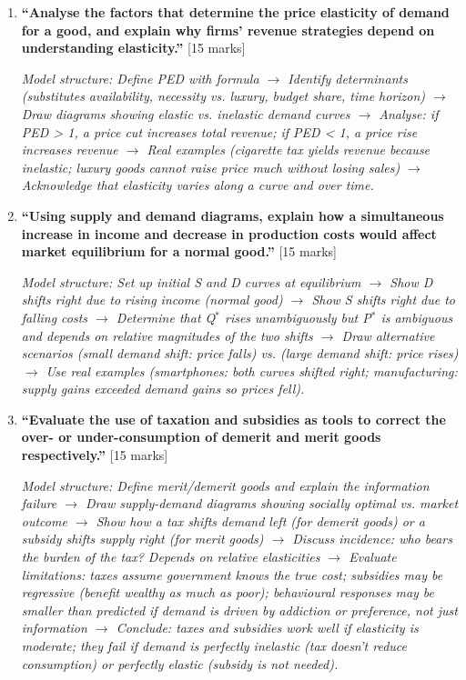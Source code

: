 \documentclass[11pt, a4paper, twoside]{book}
\begin{document}
\begin{exampractice}
\begin{enumerate}[leftmargin=*]

\item \textbf{``Analyse the factors that determine the price elasticity of demand for a good, and explain why firms' revenue strategies depend on understanding elasticity.''} [15 marks]

\textit{Model structure: Define PED with formula $\to$ Identify determinants (substitutes availability, necessity vs. luxury, budget share, time horizon) $\to$ Draw diagrams showing elastic vs. inelastic demand curves $\to$ Analyse: if PED > 1, a price cut increases total revenue; if PED < 1, a price rise increases revenue $\to$ Real examples (cigarette tax yields revenue because inelastic; luxury goods cannot raise price much without losing sales) $\to$ Acknowledge that elasticity varies along a curve and over time.}

\item \textbf{``Using supply and demand diagrams, explain how a simultaneous increase in income and decrease in production costs would affect market equilibrium for a normal good.''} [15 marks]

\textit{Model structure: Set up initial S and D curves at equilibrium $\to$ Show D shifts right due to rising income (normal good) $\to$ Show S shifts right due to falling costs $\to$ Determine that Q$^*$ rises unambiguously but P$^*$ is ambiguous and depends on relative magnitudes of the two shifts $\to$ Draw alternative scenarios (small demand shift: price falls) vs. (large demand shift: price rises) $\to$ Use real examples (smartphones: both curves shifted right; manufacturing: supply gains exceeded demand gains so prices fell).}

\item \textbf{``Evaluate the use of taxation and subsidies as tools to correct the over- or under-consumption of demerit and merit goods respectively.''} [15 marks]

\textit{Model structure: Define merit/demerit goods and explain the information failure $\to$ Draw supply-demand diagrams showing socially optimal vs. market outcome $\to$ Show how a tax shifts demand left (for demerit goods) or a subsidy shifts supply right (for merit goods) $\to$ Discuss incidence: who bears the burden of the tax? Depends on relative elasticities $\to$ Evaluate limitations: taxes assume government knows the true cost; subsidies may be regressive (benefit wealthy as much as poor); behavioural responses may be smaller than predicted if demand is driven by addiction or preference, not just information $\to$ Conclude: taxes and subsidies work well if elasticity is moderate; they fail if demand is perfectly inelastic (tax doesn't reduce consumption) or perfectly elastic (subsidy is not needed).}


\end{enumerate}
\end{exampractice}
\end{document}
